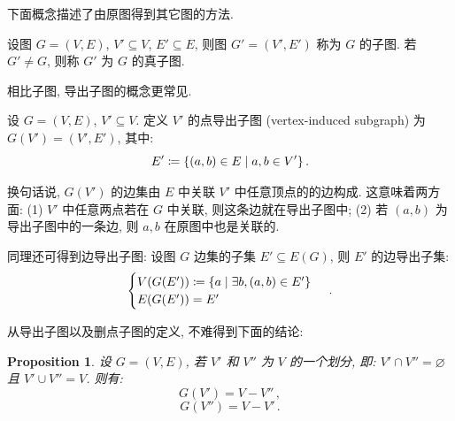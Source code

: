 \documentclass[UTF8]{ctexart}
\theoremstyle{mystyle}
\newtheorem{proposition}{Proposition}[section]
\theoremstyle{myremark}
\theoremstyle{plain}
\DeclarePairedDelimiter\set{\{}{\}}
\begin{document}
下面概念描述了由原图得到其它图的方法.
\begin{definition}[\text{子图}]
    设图 $ G = (V, E) $, $ V' \subseteq V $, $ E' \subseteq E $, 则图 $ G' = (V', E') $ 称为 $ G $ 的子图. 若 $ G' \neq G $, 则称 $ G' $ 为 $ G $ 的真子图.
\end{definition}

相比子图, 导出子图的概念更常见.

\begin{definition}
    设 $ G = (V, E) $, $ V' \subseteq V $. 定义 $ V' $ 的点导出子图 (vertex-induced subgraph) 为 $ G(V') = (V', E') $, 其中:
    \[ E' \coloneqq \set{(a, b) \in E \mid a, b \in V'} \,.\]
\end{definition}

换句话说, $ G(V') $ 的边集由 $ E $ 中关联 $ V' $ 中任意顶点的的边构成. 这意味着两方面: (1) $ V' $ 中任意两点若在 $ G $ 中关联, 则这条边就在导出子图中; (2) 若 $ (a, b) $ 为导出子图中的一条边, 则 $ a, b $ 在原图中也是关联的.

同理还可得到边导出子图: 设图 $ G $ 边集的子集 $ E' \subseteq E(G) $, 则 $ E' $ 的边导出子集:
\[ \begin{cases}
    V(G(E')) \coloneqq \set{a \mid \exists b, (a, b) \in E'} \\
    E(G(E')) = E'
\end{cases} \,.\]


从导出子图以及删点子图的定义, 不难得到下面的结论:
\begin{proposition}
    设 $ G = (V, E) $, 若 $ V' $ 和 $ V'' $ 为 $ V $ 的一个划分, 即: $ V' \cap V'' = \varnothing $ 且 $ V' \cup V'' = V $. 则有:
    \[ G(V') = V - V'' \,,\]
    \[ G(V'') = V - V' \,.\]
\end{proposition}
\end{document}
